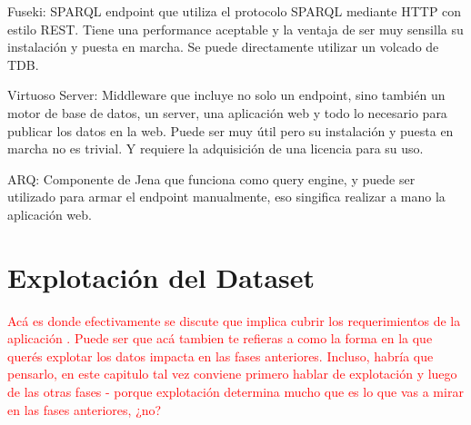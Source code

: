 Fuseki: SPARQL endpoint que utiliza el protocolo SPARQL mediante HTTP con estilo REST. Tiene una performance aceptable y la ventaja de ser muy sensilla su instalación y puesta en marcha. Se puede directamente utilizar un volcado de TDB.

Virtuoso Server: Middleware que incluye no solo un endpoint, sino también un motor de base de datos, un server, una aplicación web y todo lo necesario para publicar los datos en la web. Puede ser muy útil pero su instalación y puesta en marcha no es trivial. Y requiere la adquisición de una licencia para su uso.

ARQ: Componente de Jena que funciona como query engine, y puede ser utilizado para armar el endpoint manualmente, eso singifica realizar a mano la aplicación web.

\section{Explotación del Dataset}
\begin{framed}
\textcolor{red}{Acá es donde efectivamente se discute que implica cubrir los requerimientos de la aplicación . Puede ser que acá tambien te refieras a como la forma en la que querés explotar los datos impacta en las fases anteriores. Incluso, habría que pensarlo, en este capitulo tal vez conviene primero hablar de explotación y luego de las otras fases - porque explotación determina mucho que es lo que vas a mirar en las fases anteriores, ¿no?}
\end{framed}

